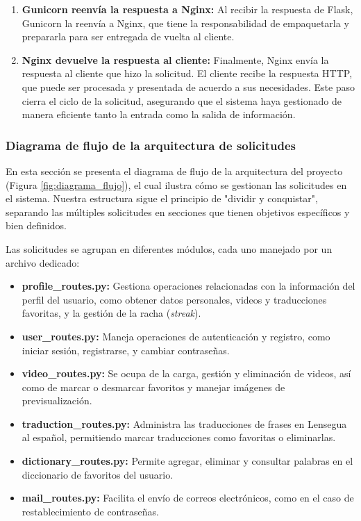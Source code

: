 \begin{enumerate}
    \item \textbf{Gunicorn reenvía la respuesta a Nginx:} 
    Al recibir la respuesta de Flask, Gunicorn la reenvía a Nginx, que tiene la responsabilidad de empaquetarla y prepararla para ser entregada de vuelta al cliente.

    \item \textbf{Nginx devuelve la respuesta al cliente:} 
    Finalmente, Nginx envía la respuesta al cliente que hizo la solicitud. El cliente recibe la respuesta HTTP, que puede ser procesada y presentada de acuerdo a sus necesidades. Este paso cierra el ciclo de la solicitud, asegurando que el sistema haya gestionado de manera eficiente tanto la entrada como la salida de información.
\end{enumerate}


\subsubsection{Diagrama de flujo de la arquitectura de solicitudes}

En esta sección se presenta el diagrama de flujo de la arquitectura del proyecto (Figura \ref{fig:diagrama_flujo}), el cual ilustra cómo se gestionan las solicitudes en el sistema. Nuestra estructura sigue el principio de "dividir y conquistar", separando las múltiples solicitudes en secciones que tienen objetivos específicos y bien definidos. 

Las solicitudes se agrupan en diferentes módulos, cada uno manejado por un archivo dedicado:
\begin{itemize}
    \item \textbf{profile\_routes.py:} Gestiona operaciones relacionadas con la información del perfil del usuario, como obtener datos personales, videos y traducciones favoritas, y la gestión de la racha (\textit{streak}).
    \item \textbf{user\_routes.py:} Maneja operaciones de autenticación y registro, como iniciar sesión, registrarse, y cambiar contraseñas.
    \item \textbf{video\_routes.py:} Se ocupa de la carga, gestión y eliminación de videos, así como de marcar o desmarcar favoritos y manejar imágenes de previsualización.
    \item \textbf{traduction\_routes.py:} Administra las traducciones de frases en Lensegua al español, permitiendo marcar traducciones como favoritas o eliminarlas.
    \item \textbf{dictionary\_routes.py:} Permite agregar, eliminar y consultar palabras en el diccionario de favoritos del usuario.
    \item \textbf{mail\_routes.py:} Facilita el envío de correos electrónicos, como en el caso de restablecimiento de contraseñas.
\end{itemize}

